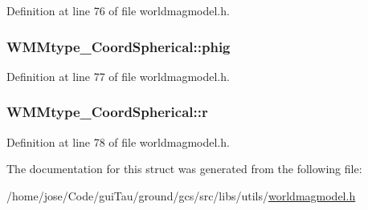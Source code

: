 Definition at line 76 of file worldmagmodel.\-h.

\hypertarget{struct_w_m_mtype___coord_spherical_a3c1dc1afddaf89194d67521dfe135585}{
\subsubsection[{phig}]{ W\-M\-Mtype\-\_\-\-Coord\-Spherical\-::phig}}\label{struct_w_m_mtype___coord_spherical_a3c1dc1afddaf89194d67521dfe135585}


Definition at line 77 of file worldmagmodel.\-h.

\hypertarget{struct_w_m_mtype___coord_spherical_a24681de24337609c5f3dc7a6346c6674}{
\subsubsection[{r}]{ W\-M\-Mtype\-\_\-\-Coord\-Spherical\-::r}}\label{struct_w_m_mtype___coord_spherical_a24681de24337609c5f3dc7a6346c6674}


Definition at line 78 of file worldmagmodel.\-h.



The documentation for this struct was generated from the following file\-:\begin{DoxyCompactItemize}
\item 
/home/jose/\-Code/gui\-Tau/ground/gcs/src/libs/utils/\hyperlink{worldmagmodel_8h}{worldmagmodel.\-h}\end{DoxyCompactItemize}
